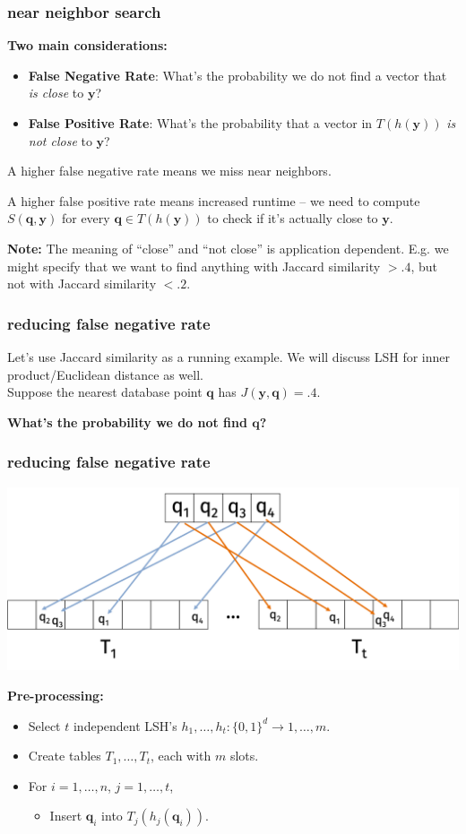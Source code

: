 \documentclass[compress]{beamer}
\newcommand{\bv}[1]{\mathbf{#1}}
\begin{document}
\begin{frame}
	\frametitle{near neighbor search}
	\textbf{Two main considerations:}
	\begin{itemize}
		\item \textbf{False Negative Rate}: What's the probability we do not find a vector that \emph{is close} to $\bv{y}$?
		\item \textbf{False Positive Rate}: What's the probability that a vector in $T(h(\bv{y}))$ \emph{is not close} to $\bv{y}$?
	\end{itemize}

A higher false negative rate means we miss near neighbors.

A higher false positive rate means increased runtime -- we need to compute $S(\bv{q},\bv{y})$ for every $\bv{q}\in T(h(\bv{y}))$ to check if it's actually close to $\bv{y}$.

\textbf{Note:} The meaning of ``close'' and ``not close'' is application dependent. E.g. we might specify that we want to find anything with Jaccard similarity $> .4$, but not with Jaccard similarity $< .2$. 
\end{frame}

\begin{frame}[t]
	\frametitle{reducing false negative rate}	
	Let's use Jaccard similarity as a running example. We will discuss LSH for inner product/Euclidean distance as well. \\

	Suppose the nearest database point $\bv{q}$ has $J(\bv{y},\bv{q}) = .4$.
	\begin{center}
	\textbf{\alert{What's the probability we do not find $\bv{q}$?}}
	\end{center}
\end{frame}

\begin{frame}
	\frametitle{reducing false negative rate}
	\begin{center}
		\includegraphics[width=.8\textwidth]{many_tables.png}
	\end{center}
	\textbf{Pre-processing:}
	\begin{itemize}
		\item Select $t$ independent LSH's $h_1, \ldots, h_t: \{0,1\}^d \rightarrow 1,\ldots, m$.
		\item Create tables $T_1, \ldots, T_t$, each with $m$ slots. 
		\item For $i = 1,\ldots, n$, $j = 1,\ldots, t$, 
		\begin{itemize}
			\item Insert $\bv{q}_i$ into $T_j(h_j(\bv{q}_i))$.
		\end{itemize}
	\end{itemize}
\end{frame}
\end{document}

